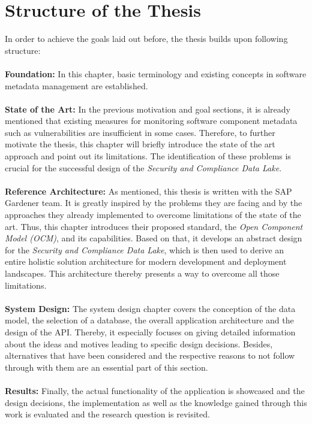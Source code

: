 \section{Structure of the Thesis}
In order to achieve the goals laid out before, the thesis builds upon following structure:\\\\
\textbf{Foundation:} In this chapter, basic terminology and existing concepts in software metadata management are established.\\\\
\textbf{State of the Art:} In the previous motivation and goal sections, it is already mentioned that existing measures for monitoring software component metadata such as vulnerabilities are insufficient in some cases. Therefore, to further motivate the thesis, this chapter will briefly introduce the state of the art approach and point out its limitations. The identification of these problems is crucial for the successful design of the \emph{Security and Compliance Data Lake}.\\\\
\textbf{Reference Architecture:} As mentioned, this thesis is written with the SAP Gardener team.  It is greatly inspired by the problems they are facing and by the approaches they already implemented to overcome limitations of the state of the art. Thus, this chapter introduces their proposed standard, the \emph{Open Component Model (OCM)}, and its capabilities. Based on that, it develops an abstract design for the \emph{Security and Compliance Data Lake}, which is then used to derive an entire holistic solution architecture for modern development and deployment landscapes. This architecture thereby presents a way to overcome all those limitations.\\\\
\textbf{System Design:} The system design chapter covers the conception of the data model, the selection of a database, the overall application architecture and the design of the API. Thereby, it especially focuses on giving detailed information about the ideas and motives leading to specific design decisions. Besides, alternatives that have been considered and the respective reasons to not follow through with them are an essential part of this section.\\\\
\textbf{Results:} Finally, the actual functionality of the application is showcased and the design decisions, the implementation as well as the knowledge gained through this work is evaluated and the research question is revisited.